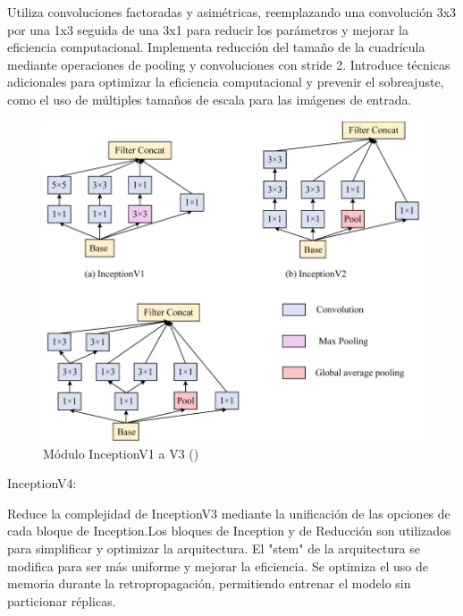 \begin{itemize}
	Utiliza convoluciones factoradas y asimétricas, reemplazando una convolución 3x3 por una 1x3 seguida de una 3x1 para reducir los parámetros y mejorar la eficiencia computacional.
	Implementa reducción del tamaño de la cuadrícula mediante operaciones de pooling y convoluciones con stride 2.
	Introduce técnicas adicionales para optimizar la eficiencia computacional y prevenir el sobreajuste, como el uso de múltiples tamaños de escala para las imágenes de entrada.
	\begin{figure}[H]
		\begin{center}
			\includegraphics[width=1\textwidth]{2/figures/cn55.jpeg}
			\caption{  Módulo InceptionV1 a V3
				(\cite{tecnica2})}
		\end{center}
	\end{figure}
	InceptionV4:
	
	Reduce la complejidad de InceptionV3 mediante la unificación de las opciones de cada bloque de Inception.Los bloques de Inception y de Reducción son utilizados para simplificar y optimizar la arquitectura. El "stem" de la arquitectura se modifica para ser más uniforme y mejorar la eficiencia. Se optimiza el uso de memoria durante la retropropagación, permitiendo entrenar el modelo sin particionar réplicas.
	

\end{itemize}
